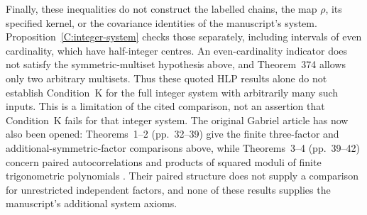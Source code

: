 Finally, these inequalities do not construct the labelled chains,
the map \(\rho\), its specified kernel, or the covariance identities
of the manuscript's system.  Proposition~\ref{C:integer-system}
checks those separately, including intervals of even cardinality,
which have half-integer centres.  An even-cardinality indicator
does not satisfy the symmetric-multiset hypothesis above, and
Theorem~374 allows only two arbitrary multisets.  Thus these quoted
HLP results alone do not establish Condition~K for the full integer
system with arbitrarily many such inputs.  This is a limitation of
the cited comparison, not an assertion that Condition~K fails for
that integer system.  The original Gabriel article has now also
been opened: Theorems~1--2 (pp.~32--39) give the finite three-factor
and additional-symmetric-factor comparisons above, while
Theorems~3--4 (pp.~39--42) concern paired autocorrelations and
products of squared moduli of finite trigonometric polynomials
\cite{C_Gabriel1932}. Their paired structure does not supply a
comparison for unrestricted independent factors, and none of these
results supplies the manuscript's additional system axioms.
